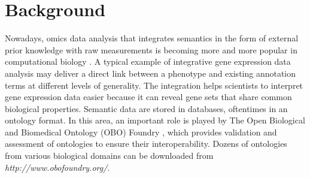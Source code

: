 \documentclass{bmcart}
\begin{document}



\section*{Background}
Nowadays, omics data analysis that integrates semantics in the form of external prior knowledge with raw measurements is becoming more and more popular in computational biology \cite{stevens2000ontology,osterlund2017integrative,rajasundaram2016more}. A typical example of integrative gene expression data analysis may deliver a direct link between a phenotype and existing annotation terms at different levels of generality. The integration helps scientists to interpret gene expression data easier because it can reveal gene sets that share common biological properties. Semantic data are stored in databases, oftentimes in an ontology format. In this area, an important role is played by The Open Biological and Biomedical Ontology (OBO) Foundry \cite{smith2007obo}, which provides validation and assessment of ontologies to ensure their interoperability. Dozens of ontologies from various biological domains can be downloaded from \emph{http://www.obofoundry.org/}. 
\end{document}
